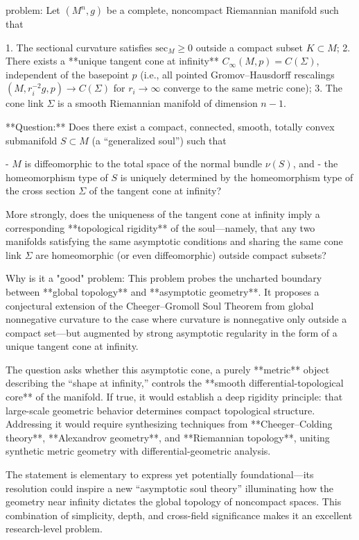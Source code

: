 problem:  
Let \( (M^n,g) \) be a complete, noncompact Riemannian manifold such that  

1. The sectional curvature satisfies \( \mathrm{sec}_M \ge 0 \) outside a compact subset \( K \subset M \);  
2. There exists a **unique tangent cone at infinity** \( C_\infty(M,p) = C(\Sigma) \), independent of the basepoint \(p\) (i.e., all pointed Gromov–Hausdorff rescalings \( (M, r_i^{-2} g, p) \to C(\Sigma) \) for \( r_i \to \infty \) converge to the same metric cone);  
3. The cone link \( \Sigma \) is a smooth Riemannian manifold of dimension \( n-1 \).  

**Question:**  
Does there exist a compact, connected, smooth, totally convex submanifold \( S \subset M \) (a “generalized soul”) such that  

- \( M \) is diffeomorphic to the total space of the normal bundle \( \nu(S) \), and  
- the homeomorphism type of \( S \) is uniquely determined by the homeomorphism type of the cross section \( \Sigma \) of the tangent cone at infinity?  

More strongly, does the uniqueness of the tangent cone at infinity imply a corresponding **topological rigidity** of the soul—namely, that any two manifolds satisfying the same asymptotic conditions and sharing the same cone link \( \Sigma \) are homeomorphic (or even diffeomorphic) outside compact subsets?

Why is it a "good" problem:  
This problem probes the uncharted boundary between **global topology** and **asymptotic geometry**. It proposes a conjectural extension of the Cheeger–Gromoll Soul Theorem from global nonnegative curvature to the case where curvature is nonnegative only outside a compact set—but augmented by strong asymptotic regularity in the form of a unique tangent cone at infinity.  

The question asks whether this asymptotic cone, a purely **metric** object describing the “shape at infinity,” controls the **smooth differential-topological core** of the manifold. If true, it would establish a deep rigidity principle: that large-scale geometric behavior determines compact topological structure. Addressing it would require synthesizing techniques from **Cheeger–Colding theory**, **Alexandrov geometry**, and **Riemannian topology**, uniting synthetic metric geometry with differential-geometric analysis.  

The statement is elementary to express yet potentially foundational—its resolution could inspire a new “asymptotic soul theory” illuminating how the geometry near infinity dictates the global topology of noncompact spaces. This combination of simplicity, depth, and cross-field significance makes it an excellent research-level problem.